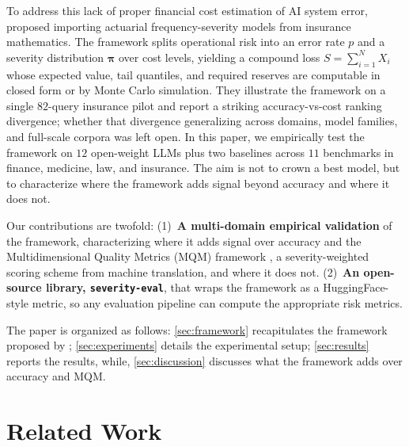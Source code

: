 \documentclass[11pt]{article}
\newcommand{\seveval}{\texttt{severity-eval}}
\newcommand{\bpi}{\boldsymbol{\pi}}
\begin{document}
To address this lack of proper financial cost estimation of AI system error, \citet{beauchemin2026position} proposed importing actuarial
frequency-severity models from insurance mathematics. The
framework splits operational risk into an error rate $p$ and a
severity distribution $\bpi$ over cost levels, yielding a
compound loss $S = \sum_{i=1}^{N} X_i$ whose expected value, tail
quantiles, and required reserves are computable in closed form
or by Monte Carlo simulation. They illustrate the framework on
a single $82$-query insurance pilot and report a striking
accuracy-vs-cost ranking divergence; whether that divergence
generalizing across domains, model families, and full-scale corpora was left open.
In this paper, we empirically test the framework on $12$
open-weight LLMs plus two baselines across $11$
benchmarks in finance, medicine, law, and insurance. The aim is not to crown a best model, but to characterize where the framework adds
signal beyond accuracy and where it does not.

Our contributions are twofold:
(1)~\textbf{A multi-domain empirical validation} of the
framework, characterizing where it adds signal over accuracy and the Multidimensional Quality Metrics (MQM) framework \citep{lommel2014mqm}, a severity-weighted scoring scheme from machine translation, and where it does not.
(2)~\textbf{An open-source library, \seveval{}}, that wraps the framework as a HuggingFace-style metric, so any evaluation pipeline can compute the appropriate risk metrics.

The paper is organized as follows:
\autoref{sec:framework} recapitulates the framework proposed by \citet{beauchemin2026position};
\autoref{sec:experiments} details the experimental setup; \autoref{sec:results}
reports the results, while, \autoref{sec:discussion}
discusses what the framework adds over accuracy and MQM.


\section{Related Work}
\label{sec:related-work}
\end{document}
